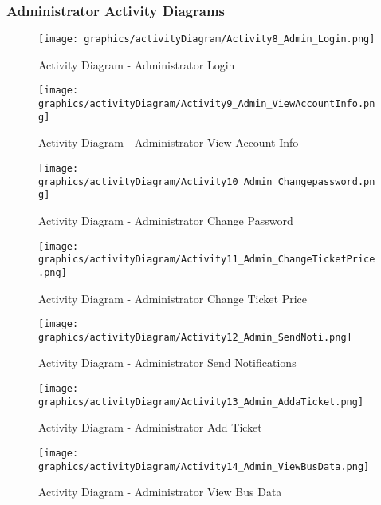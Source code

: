     \subsubsection{Administrator Activity Diagrams}
        \begin{figure}[H]
            \centering
            \texttt{[image: graphics/activityDiagram/Activity8\_Admin\_Login.png]}
            \caption{Activity Diagram - Administrator Login}
        \label{fig:activitydiagram8}
        \end{figure}
        \begin{figure}[H]
            \centering
            \texttt{[image: graphics/activityDiagram/Activity9\_Admin\_ViewAccountInfo.png]}
            \caption{Activity Diagram - Administrator View Account Info}
        \label{fig:activitydiagram9}
        \end{figure}
        \begin{figure}[H]
            \centering
            \texttt{[image: graphics/activityDiagram/Activity10\_Admin\_Changepassword.png]}
            \caption{Activity Diagram - Administrator Change Password}
        \label{fig:activitydiagram10}
        \end{figure}
        \begin{figure}[H]
            \centering
            \texttt{[image: graphics/activityDiagram/Activity11\_Admin\_ChangeTicketPrice.png]}
            \caption{Activity Diagram - Administrator Change Ticket Price}
        \label{fig:activitydiagram11}
        \end{figure}
        \begin{figure}[H]
            \centering
            \texttt{[image: graphics/activityDiagram/Activity12\_Admin\_SendNoti.png]}
            \caption{Activity Diagram - Administrator Send Notifications}
        \label{fig:activitydiagram12}
        \end{figure}
        \begin{figure}[H]
            \centering
            \texttt{[image: graphics/activityDiagram/Activity13\_Admin\_AddaTicket.png]}
            \caption{Activity Diagram - Administrator Add Ticket}
        \label{fig:activitydiagram13}
        \end{figure}
        \begin{figure}[H]
            \centering
            \texttt{[image: graphics/activityDiagram/Activity14\_Admin\_ViewBusData.png]}
            \caption{Activity Diagram - Administrator View Bus Data}
        \label{fig:activitydiagram14}
        \end{figure}
